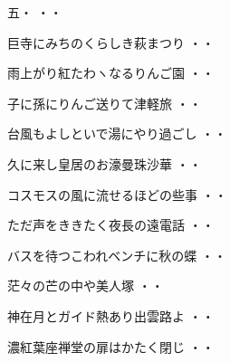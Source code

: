 \begin{shiika}五・
\hfill{・・}\end{shiika}
\vspace{0.6cm}
\begin{shiika}巨寺にみちのくらしき萩まつり
\hfill{・・}\end{shiika}
\vspace{0.6cm}
\begin{shiika}雨上がり紅たわヽなるりんご園
\hfill{・・}\end{shiika}
\vspace{0.6cm}
\begin{shiika}子に孫にりんご送りて津軽旅
\hfill{・・}\end{shiika}
\vspace{0.6cm}
\begin{shiika}台風もよしといで湯にやり過ごし
\hfill{・・}\end{shiika}
\vspace{0.6cm}
\begin{shiika}久に来し皇居のお濠曼珠沙華
\hfill{・・}\end{shiika}
\vspace{0.6cm}
\begin{shiika}コスモスの風に流せるほどの些事
\hfill{・・}\end{shiika}
\vspace{0.6cm}
\begin{shiika}ただ声をききたく夜長の遠電話
\hfill{・・}\end{shiika}
\vspace{0.6cm}
\begin{shiika}バスを待つこわれベンチに秋の蝶
\hfill{・・}\end{shiika}
\vspace{0.6cm}
\begin{shiika}茫々の芒の中や美人塚
\hfill{・・}\end{shiika}
\vspace{0.6cm}
\begin{shiika}神在月とガイド熱あり出雲路よ
\hfill{・・}\end{shiika}
\vspace{0.6cm}
\begin{shiika}濃紅葉座禅堂の扉はかたく閉じ
\hfill{・・}\end{shiika}
